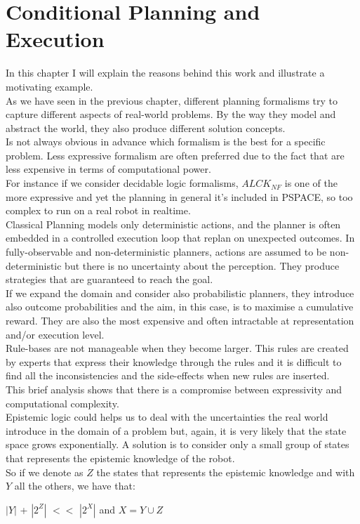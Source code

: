 \documentclass[pdftex,12pt,a4paper]{report}
\begin{document}
\chapter{Conditional Planning and Execution}\label{sec:approach}
In this chapter I will explain the reasons behind this work and illustrate a motivating example.\\
\newline
\noindent As we have seen in the previous chapter, different planning formalisms try to capture different aspects of real-world problems. By the way they model and abstract the world, they also produce different solution concepts.\\
Is not always obvious in advance which formalism is the best for a specific problem. Less expressive formalism are often preferred due to the fact that are less expensive in terms of computational power.\\
For instance if we consider decidable logic formalisms, $ALCK_{NF}$ is one of the more expressive and yet the planning in general it's included in PSPACE, so too complex to run on a real robot in realtime.\\ 
Classical Planning models only deterministic actions, and the planner is often embedded in a controlled execution loop that replan on unexpected outcomes. In fully-observable and non-deterministic planners, actions are assumed to be non-deterministic but there is no uncertainty about the perception. They produce strategies that are guaranteed to reach the goal. \\
If we expand the domain and consider also probabilistic planners, they introduce also outcome probabilities and the aim, in this case, is to maximise a cumulative reward. They are also the most expensive and often intractable at representation and/or execution level. \\
Rule-bases are not manageable when they become larger. This rules are created by experts that express their knowledge through the rules and it is difficult to find all the inconsistencies and the side-effects when new rules are inserted.\\
This brief analysis shows that there is a compromise between expressivity and computational complexity. \\ 
Epistemic logic could helps us to deal with the uncertainties the real world introduce in the domain of a problem but, again, it is very likely that the state space grows exponentially. A solution is to consider only a small group of states that represents the epistemic knowledge of the robot.\\
So if we denote as $Z$ the states that represents the epistemic knowledge and with $Y$ all the others, we have that:
\begin{center}
$|Y|$ + $|2^Z|$ $<<$ $|2^X|$ and $X = Y \cup Z$
\end{center}
\end{document}
